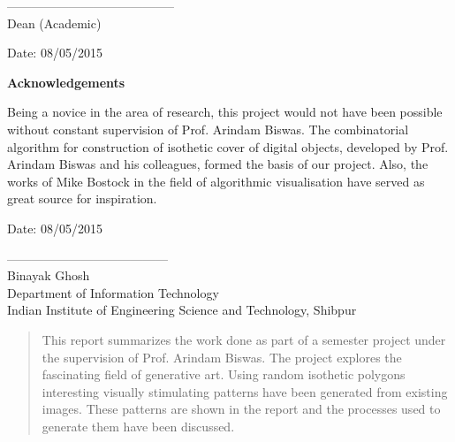 \documentclass[12pt]{article}
\begin{document}
\begin{minipage}[t]{0.48\linewidth}
-----------------------------------------\\
Dean (Academic)
\end{minipage}\hfill
\begin{minipage}[t]{0.48\linewidth}
\begin{center}
Date: 08/05/2015
\end{center}
\end{minipage}




\newpage




\thispagestyle{empty}
\begin{center}
  \Huge \textbf{Acknowledgements}
\end{center}
\vspace{2cm}
Being a novice in the area of research, this project would not have been possible without constant
supervision of Prof. Arindam Biswas. The combinatorial algorithm for construction of isothetic cover of digital objects, developed by Prof. Arindam Biswas and his colleagues, formed the basis of our project. Also, the works of Mike Bostock in the field of algorithmic visualisation have served as great source for inspiration.\\
\vspace{2.5cm}

\begin{minipage}[t]{0.48\linewidth}
\begin{flushleft}
Date: 08/05/2015
\end{flushleft}
\end{minipage}\hfill
\begin{minipage}[t]{0.48\linewidth}
\begin{flushright}
---------------------------------------\\
Binayak Ghosh\\
Department of Information Technology\\
Indian Institute of Engineering Science and Technology, Shibpur
\end{flushright}
\end{minipage}




\newpage




\begin{abstract}
This report summarizes the work done as part of a semester project under the supervision of Prof. Arindam Biswas. The project explores the fascinating field of generative art. Using random isothetic polygons interesting visually stimulating patterns have been generated from existing images. These patterns are shown in the report and the processes used to generate them have been discussed.

\end{abstract}
\end{document}
